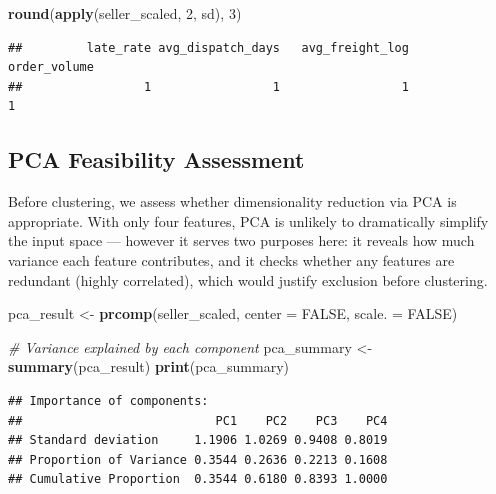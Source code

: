 \documentclass[
]{article}
\newenvironment{Shaded}{\begin{snugshade}}{\end{snugshade}}
\newcommand{\AttributeTok}[1]{\textcolor[rgb]{0.13,0.29,0.53}{#1}}
\newcommand{\CommentTok}[1]{\textcolor[rgb]{0.56,0.35,0.01}{\textit{#1}}}
\newcommand{\ConstantTok}[1]{\textcolor[rgb]{0.56,0.35,0.01}{#1}}
\newcommand{\DecValTok}[1]{\textcolor[rgb]{0.00,0.00,0.81}{#1}}
\newcommand{\FunctionTok}[1]{\textcolor[rgb]{0.13,0.29,0.53}{\textbf{#1}}}
\newcommand{\NormalTok}[1]{#1}
\newcommand{\OtherTok}[1]{\textcolor[rgb]{0.56,0.35,0.01}{#1}}
\newcommand{\SpecialCharTok}[1]{\textcolor[rgb]{0.81,0.36,0.00}{\textbf{#1}}}
\begin{document}
\begin{Shaded}
\begin{Highlighting}[]
\FunctionTok{round}\NormalTok{(}\FunctionTok{apply}\NormalTok{(seller\_scaled, }\DecValTok{2}\NormalTok{, sd), }\DecValTok{3}\NormalTok{)}
\end{Highlighting}
\end{Shaded}

\begin{verbatim}
##         late_rate avg_dispatch_days   avg_freight_log      order_volume 
##                 1                 1                 1                 1
\end{verbatim}

\subsection{PCA Feasibility
Assessment}\label{pca-feasibility-assessment}

Before clustering, we assess whether dimensionality reduction via PCA is
appropriate. With only four features, PCA is unlikely to dramatically
simplify the input space --- however it serves two purposes here: it
reveals how much variance each feature contributes, and it checks
whether any features are redundant (highly correlated), which would
justify exclusion before clustering.

\begin{Shaded}
\begin{Highlighting}[]
\NormalTok{pca\_result }\OtherTok{\textless{}{-}} \FunctionTok{prcomp}\NormalTok{(seller\_scaled, }\AttributeTok{center =} \ConstantTok{FALSE}\NormalTok{, }\AttributeTok{scale. =} \ConstantTok{FALSE}\NormalTok{)}

\CommentTok{\# Variance explained by each component}
\NormalTok{pca\_summary }\OtherTok{\textless{}{-}} \FunctionTok{summary}\NormalTok{(pca\_result)}
\FunctionTok{print}\NormalTok{(pca\_summary)}
\end{Highlighting}
\end{Shaded}

\begin{verbatim}
## Importance of components:
##                           PC1    PC2    PC3    PC4
## Standard deviation     1.1906 1.0269 0.9408 0.8019
## Proportion of Variance 0.3544 0.2636 0.2213 0.1608
## Cumulative Proportion  0.3544 0.6180 0.8393 1.0000
\end{verbatim}

\begin{Shaded}
\end{Shaded}
\end{document}
